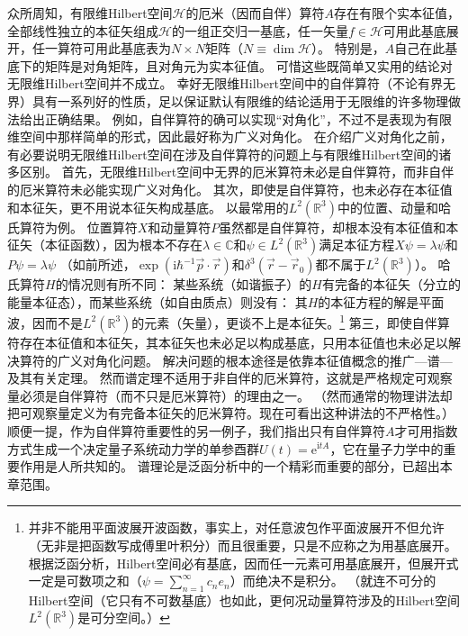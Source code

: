众所周知，有限维Hilbert空间$\mathscr{H}$的厄米（因而自伴）算符$A$存在有限个实本征值，全部线性独立的本征矢组成$\mathscr{H}$的一组正交归一基底，任一矢量$f \in \mathscr{H}$可用此基底展开，任一算符可用此基底表为$N \times N$矩阵（$N \equiv \dim \mathscr{H}$）。
特别是，$A$自己在此基底下的矩阵是对角矩阵，且对角元为实本征值。
可惜这些既简单又实用的结论对无限维Hilbert空间并不成立。
幸好无限维Hilbert空间中的自伴算符（不论有界无界）具有一系列好的性质，足以保证默认有限维的结论适用于无限维的许多物理做法给出正确结果。
例如，自伴算符的确可以实现``对角化''，不过不是表现为有限维空间中那样简单的形式，因此最好称为广义对角化。
在介绍广义对角化之前，有必要说明无限维Hilbert空间在涉及自伴算符的问题上与有限维Hilbert空间的诸多区别。
首先，无限维Hilbert空间中无界的厄米算符未必是自伴算符，而非自伴的厄米算符未必能实现广义对角化。
其次，即使是自伴算符，也未必存在本征值和本征矢，更不用说本征矢构成基底。
以最常用的$L^2(\mathbb{R}^3)$中的位置、动量和哈氏算符为例。
位置算符$X$和动量算符$P$虽然都是自伴算符，却根本没有本征值和本征矢（本征函数），因为根本不存在$\lambda \in \mathbb{C}$和$\psi \in L^2(\mathbb{R}^3)$满足本征方程$X\psi = \lambda \psi$和$P\psi = \lambda\psi$
（如前所述，$\exp(\mathrm{i}\hbar^{-1}\vec p \cdot \vec r)$和$\delta^3(\vec r - \vec r_0)$都不属于$L^2(\mathbb{R}^3)$）。
哈氏算符$H$的情况则有所不同：
某些系统（如谐振子）的$H$有完备的本征矢（分立的能量本征态），而某些系统（如自由质点）则没有：
其$H$的本征方程的解是平面波，因而不是$L^2(\mathbb{R}^3)$的元素（矢量），更谈不上是本征矢。\footnote{
    并非不能用平面波展开波函数，事实上，对任意波包作平面波展开不但允许（无非是把函数写成傅里叶积分）而且很重要，只是不应称之为用基底展开。
    根据泛函分析，Hilbert空间必有基底，因而任一元素可用基底展开，但展开式一定是可数项之和（$\psi = \sum^\infty_{n = 1}c_ne_n$）而绝决不是积分。
    （就连不可分的Hilbert空间（它只有不可数基底）也如此，更何况动量算符涉及的Hilbert空间$L^2(\mathbb{R}^3)$是可分空间。）
}
第三，即使自伴算符存在本征值和本征矢，其本征矢也未必足以构成基底，只用本征值也未必足以解决算符的广义对角化问题。
解决问题的根本途径是依靠本征值概念的推广---谱---及其有关定理。
然而谱定理不适用于非自伴的厄米算符，这就是严格规定可观察量必须是自伴算符（而不只是厄米算符）的理由之一。
（然而通常的物理讲法却把可观察量定义为有完备本征矢的厄米算符。现在可看出这种讲法的不严格性。）
顺便一提，作为自伴算符重要性的另一例子，我们指出只有自伴算符$A$才可用指数方式生成一个决定量子系统动力学的单参酉群$U(t) = \mathrm{e}^{\mathrm{i}tA}$，它在量子力学中的重要作用是人所共知的。
谱理论是泛函分析中的一个精彩而重要的部分，已超出本章范围。
